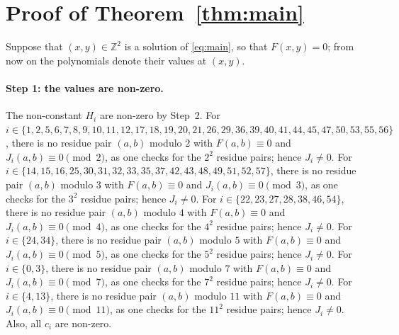 \documentclass[11pt]{article}
\newcommand{\Z}{\mathbb{Z}}
\begin{document}
\section{Proof of Theorem~\ref{thm:main}}

Suppose that $(x,y)\in\Z^2$ is a solution of \eqref{eq:main}, so that $F(x,y)=0$; from now on the polynomials denote their values at $(x,y)$.
\paragraph{Step 1: the values are non-zero.} The non-constant $H_i$ are non-zero by Step~2. For $i\in\{1,\allowbreak 2,\allowbreak 5,\allowbreak 6,\allowbreak 7,\allowbreak 8,\allowbreak 9,\allowbreak 10,\allowbreak 11,\allowbreak 12,\allowbreak 17,\allowbreak 18,\allowbreak 19,\allowbreak 20,\allowbreak 21,\allowbreak 26,\allowbreak 29,\allowbreak 36,\allowbreak 39,\allowbreak 40,\allowbreak 41,\allowbreak 44,\allowbreak 45,\allowbreak 47,\allowbreak 50,\allowbreak 53,\allowbreak 55,\allowbreak 56\}$, there is no residue pair $(a,b)$ modulo $2$ with $F(a,b)\equiv0$ and $J_i(a,b)\equiv0\pmod{2}$, as one checks for the $2^2$ residue pairs; hence $J_i\neq0$. For $i\in\{14,\allowbreak 15,\allowbreak 16,\allowbreak 25,\allowbreak 30,\allowbreak 31,\allowbreak 32,\allowbreak 33,\allowbreak 35,\allowbreak 37,\allowbreak 42,\allowbreak 43,\allowbreak 48,\allowbreak 49,\allowbreak 51,\allowbreak 52,\allowbreak 57\}$, there is no residue pair $(a,b)$ modulo $3$ with $F(a,b)\equiv0$ and $J_i(a,b)\equiv0\pmod{3}$, as one checks for the $3^2$ residue pairs; hence $J_i\neq0$. For $i\in\{22,\allowbreak 23,\allowbreak 27,\allowbreak 28,\allowbreak 38,\allowbreak 46,\allowbreak 54\}$, there is no residue pair $(a,b)$ modulo $4$ with $F(a,b)\equiv0$ and $J_i(a,b)\equiv0\pmod{4}$, as one checks for the $4^2$ residue pairs; hence $J_i\neq0$. For $i\in\{24,\allowbreak 34\}$, there is no residue pair $(a,b)$ modulo $5$ with $F(a,b)\equiv0$ and $J_i(a,b)\equiv0\pmod{5}$, as one checks for the $5^2$ residue pairs; hence $J_i\neq0$. For $i\in\{0,\allowbreak 3\}$, there is no residue pair $(a,b)$ modulo $7$ with $F(a,b)\equiv0$ and $J_i(a,b)\equiv0\pmod{7}$, as one checks for the $7^2$ residue pairs; hence $J_i\neq0$. For $i\in\{4,\allowbreak 13\}$, there is no residue pair $(a,b)$ modulo $11$ with $F(a,b)\equiv0$ and $J_i(a,b)\equiv0\pmod{11}$, as one checks for the $11^2$ residue pairs; hence $J_i\neq0$. Also, all $c_i$ are non-zero.
\end{document}
